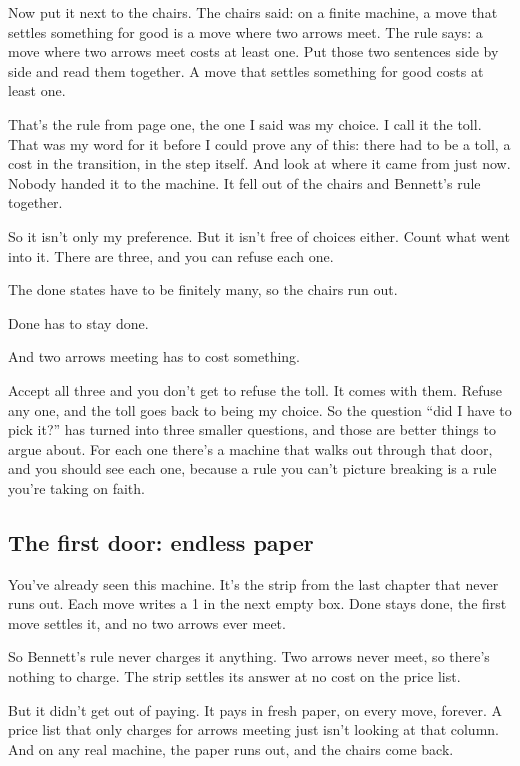 \documentclass[11pt,twoside]{article}
\theoremstyle{thielethm}
\theoremstyle{thieledef}
\theoremstyle{thieledef}
\theoremstyle{thieledef}
\theoremstyle{thielethm}
\theoremstyle{thieleobs}
\theoremstyle{thielethm}
\begin{document}
Now put it next to the chairs. The chairs said: on a finite machine, a move that settles something for good is a move where two arrows meet. The rule says: a move where two arrows meet costs at least one. Put those two sentences side by side and read them together. A move that settles something for good costs at least one.

That's the rule from page one, the one I said was my choice. I call it the toll. That was my word for it before I could prove any of this: there had to be a toll, a cost in the transition, in the step itself. And look at where it came from just now. Nobody handed it to the machine. It fell out of the chairs and Bennett's rule together.

So it isn't only my preference. But it isn't free of choices either. Count what went into it. There are three, and you can refuse each one.

The done states have to be finitely many, so the chairs run out.

Done has to stay done.

And two arrows meeting has to cost something.

Accept all three and you don't get to refuse the toll. It comes with them. Refuse any one, and the toll goes back to being my choice. So the question ``did I have to pick it?'' has turned into three smaller questions, and those are better things to argue about. For each one there's a machine that walks out through that door, and you should see each one, because a rule you can't picture breaking is a rule you're taking on faith.

\subsection{The first door: endless paper}

You've already seen this machine. It's the strip from the last chapter that never runs out. Each move writes a 1 in the next empty box. Done stays done, the first move settles it, and no two arrows ever meet.

So Bennett's rule never charges it anything. Two arrows never meet, so there's nothing to charge. The strip settles its answer at no cost on the price list.

But it didn't get out of paying. It pays in fresh paper, on every move, forever. A price list that only charges for arrows meeting just isn't looking at that column. And on any real machine, the paper runs out, and the chairs come back.
\end{document}
